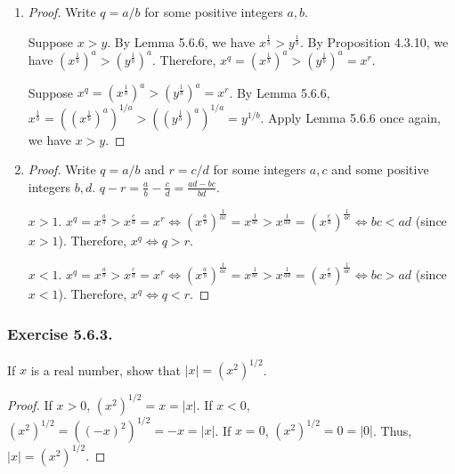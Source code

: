 \documentclass[12pt, letter]{article}
\begin{document}
\begin{enumerate}[label=(\alph*)]
\begin{proof}
        \begin{equation*}
            \begin{aligned}
                x^{-q}&=x^{-\frac{a}{b}}\\
                &=(x^{\frac{1}{b}})^{-a}\\
                &=\frac{1}{(x^{\frac{1}{b}})^a}\\
                &=\frac{1}{x^q}.
            \end{aligned}
        \end{equation*}
    \end{proof}
    \item \begin{proof}
        Write $q=a/b$ for some positive integers $a,b$. 
        
        Suppose $x>y$. By Lemma 5.6.6, we have $x^{\frac{1}{b}}>y^{\frac{1}{b}}$. By Proposition 4.3.10, we have $(x^{\frac{1}{b}})^a>(y^{\frac{1}{b}})^a$. Therefore, $x^q=(x^{\frac{1}{b}})^a>(y^{\frac{1}{b}})^a=x^r$.

        Suppose $x^q=(x^{\frac{1}{b}})^a>(y^{\frac{1}{b}})^a=x^r$. By Lemma 5.6.6, $x^{\frac{1}{b}}=((x^{\frac{1}{b}})^a)^{1/a}>((y^{\frac{1}{b}})^a)^{1/a}=y^{1/b}$. Apply Lemma 5.6.6 once again, we have $x>y$.
    \end{proof}
    \item \begin{proof}
         Write $q=a/b$ and $r=c/d$ for some integers $a,c$ and some positive integers $b,d$. $q-r=\frac{a}{b}-\frac{c}{d}=\frac{ad-bc}{bd}$. 

         $x>1$. $x^q=x^{\frac{a}{b}}>x^{\frac{c}{d}}=x^r\iff (x^{\frac{a}{b}})^{\frac{1}{ac}}=x^{\frac{1}{bc}}>x^{\frac{1}{ad}}=(x^{\frac{c}{d}})^\frac{1}{ac}\iff bc<ad$ (since $x>1$). Therefore, $x^q\iff q>r$. 

         $x<1$. $x^q=x^{\frac{a}{b}}>x^{\frac{c}{d}}=x^r\iff (x^{\frac{a}{b}})^{\frac{1}{ac}}=x^{\frac{1}{bc}}>x^{\frac{1}{ad}}=(x^{\frac{c}{d}})^\frac{1}{ac}\iff bc>ad$ (since $x<1$). Therefore, $x^q\iff q<r$. 
    \end{proof}
\end{enumerate}
\subsubsection*{Exercise 5.6.3.}
If $x$ is a real number, show that $|x|=(x^2)^{1/2}$.
\begin{proof}
    If $x>0$, $(x^2)^{1/2}=x=|x|$. If $x<0$, $(x^2)^{1/2}=((-x)^2)^{1/2}=-x=|x|$. If $x=0$, $(x^2)^{1/2}=0=|0|$. Thus, $|x|=(x^2)^{1/2}$.
\end{proof}
\end{document}
